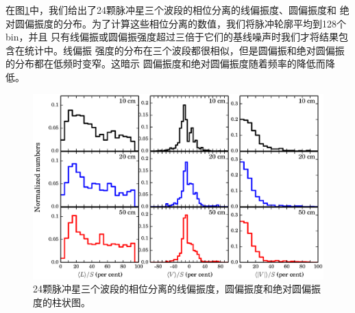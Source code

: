 在图\ref{polHist}中，我们给出了24颗脉冲星三个波段的相位分离的线偏振度、圆偏振度和
绝对圆偏振度的分布。为了计算这些相位分离的数值，我们将脉冲轮廓平均到128个bin，并且
只有线偏振或圆偏振强度超过三倍于它们的基线噪声时我们才将结果包含在统计中。线偏振
强度的分布在三个波段都很相似，但是圆偏振和绝对圆偏振的分布都在低频时变窄。这暗示
圆偏振度和绝对圆偏振度随着频率的降低而降低。


\begin{figure}
\begin{center}
\includegraphics[width=5.5 in]{polHist.ps}
\caption{24颗脉冲星三个波段的相位分离的线偏振度，圆偏振度和绝对圆偏振度的柱状图。}
\label{polHist}
\end{center}
\end{figure}

